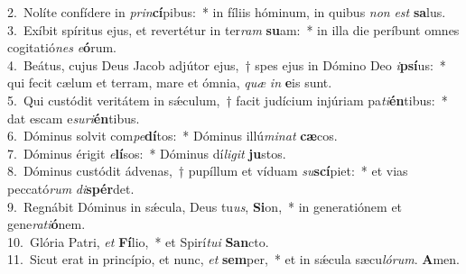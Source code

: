 {2.~}Nolíte confídere in \textit{prin}\textbf{cí}pibus:~* in fíliis hóminum, in quibus \textit{non} \textit{est} \textbf{sa}lus.\\
{3.~}Exíbit spíritus ejus, et revertétur in ter\textit{ram} \textbf{su}am:~* in illa die períbunt omnes cogitatió\textit{nes} \textit{e}\textbf{ó}rum.\\
{4.~}Beátus, cujus Deus Jacob adjútor ejus,~† spes ejus in Dómino Deo \textit{i}\textbf{psí}us:~* qui fecit cælum et terram, mare et ómnia, \textit{quæ} \textit{in} \textbf{e}is sunt.\\
{5.~}Qui custódit veritátem in sǽculum,~† facit judícium injúriam pa\textit{ti}\textbf{én}tibus:~* dat escam e\textit{su}\textit{ri}\textbf{én}tibus.\\
{6.~}Dóminus solvit com\textit{pe}\textbf{dí}tos:~* Dóminus illú\textit{mi}\textit{nat} \textbf{cæ}cos.\\
{7.~}Dóminus érigit \textit{e}\textbf{lí}sos:~* Dóminus dí\textit{li}\textit{git} \textbf{ju}stos.\\
{8.~}Dóminus custódit ádvenas,~† pupíllum et víduam \textit{su}\textbf{scí}piet:~* et vias peccató\textit{rum} \textit{di}\textbf{spér}det.\\
{9.~}Regnábit Dóminus in sǽcula, Deus tu\textit{us}, \textbf{Si}on,~* in generatiónem et gene\textit{ra}\textit{ti}\textbf{ó}nem.\\
{10.~}Glória Patri, \textit{et} \textbf{Fí}lio,~* et Spirí\textit{tu}\textit{i} \textbf{San}cto.\\
{11.~}Sicut erat in princípio, et nunc, \textit{et} \textbf{sem}per,~* et in sǽcula sæcu\textit{ló}\textit{rum}. \textbf{A}men.\\

